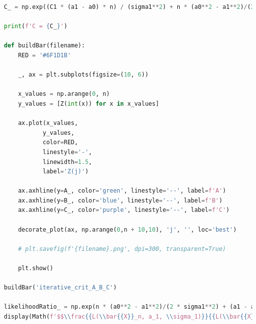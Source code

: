 \documentclass[a4paper, 14pt]{extarticle}
\begin{document}
\begin{center}
\begin{lstlisting}[language=Python]
C_ = np.exp((C1 * (a1 - a0) * n) / (sigma1**2) + n * (a0**2 - a1**2)/(2 * sigma1**2))

print(f'C = {C_}')

def buildBar(filename):
    RED = '#6F1D1B'

    _, ax = plt.subplots(figsize=(10, 6))

    x_values = np.arange(0, n)
    y_values = [Z(int(x)) for x in x_values]

    ax.plot(x_values, 
           y_values, 
           color=RED, 
           linestyle='-', 
           linewidth=1.5,
           label='Z(j)')
    
    ax.axhline(y=A_, color='green', linestyle='--', label=f'A')
    ax.axhline(y=B_, color='blue', linestyle='--', label=f'B')
    ax.axhline(y=C_, color='purple', linestyle='--', label=f'C')

    decorate_plot(ax, np.arange(0,n + 10,10), 'j', '', loc='best')

    # plt.savefig(f'{filename}.png', dpi=300, transparent=True)

    plt.show()

buildBar('iterative_crit_A_B_C')

likelihoodRatio_ = np.exp(n * (a0**2 - a1**2)/(2 * sigma1**2) + (a1 - a0)/sigma1**2 * np.sum(data_))
display(Math(f'$$\\frac{{L(\\bar{{X}}_n, a_1, \\sigma_1)}}{{L(\\bar{{X}}_n, a_0, \\sigma_1)}} = {likelihoodRatio_}$$'))
  \end{lstlisting}
\end{center}
\end{document}
